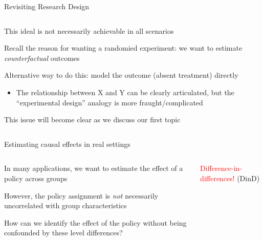 \documentclass[notes,11pt, aspectratio=169]{beamer}
\newenvironment{wideitemize}{\itemize\addtolength{\itemsep}{10pt}}{\enditemize}
\begin{document}
\begin{frame}{Revisiting Research Design}
  \begin{columns}[T] %
    \begin{column}{0.7\textwidth}
      \begin{wideitemize}
      \item This ideal is not necessarily achievable in all scenarios
      \item Recall the reason for wanting a randomied experiment: we want to estimate \emph{counterfactual} outcomes
      \item Alternative way to do this: model the outcome (absent treatment) directly
        \begin{itemize}
        \item The relationship between X and Y can be clearly
          articulated, but the ``experimental design'' analogy is more fraught/complicated
        \end{itemize}
      \item This issue will become clear as we discuss our first topic
      \end{wideitemize}
    \end{column}%
    \hfill%
    \begin{column}{.7\textwidth}

    \end{column}%
  \end{columns}
\end{frame}


\begin{frame}{Estimating causal effects in real settings}
  \begin{columns}[T] %
    \begin{column}{.58\textwidth}
      \begin{wideitemize}
      \item In many applications, we want to estimate the effect of a policy across groups
      \item However, the policy assignment is  \emph{not} necessarily uncorrelated with group characteristics
      \item How can we identify the effect of the policy without being confounded by these level differences?
      \end{wideitemize}
    \end{column}%
    \hfill%
    \begin{column}{.38\textwidth}
      {
        \vspace{30pt}
      \begin{center}
        \Large \textcolor{red}{Difference-in-differences!}
        \normalsize (DinD)
        \end{center}
        }
    \end{column}%
  \end{columns}
\end{frame}
\end{document}
